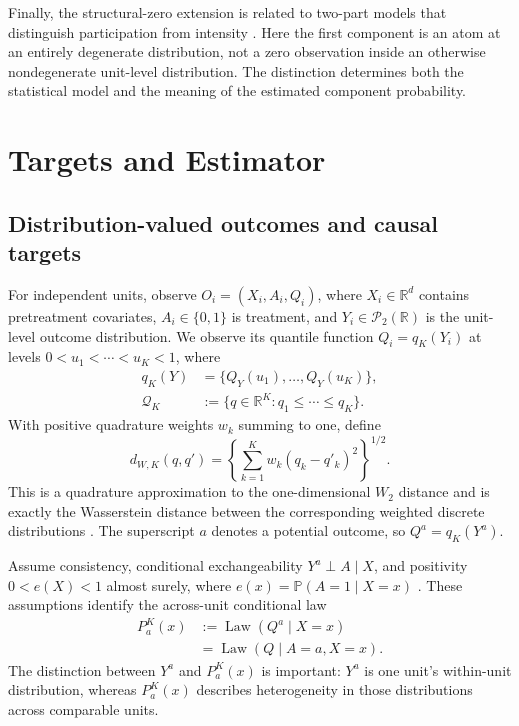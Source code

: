 \documentclass[twoside]{article}
\newcommand{\Prob}{\mathbb{P}}
\newcommand{\QK}{\mathcal{Q}_K}
\newcommand{\Law}{\operatorname{Law}}
\begin{document}
Finally, the structural-zero extension is related to two-part models that distinguish participation from intensity \citep{duan1983medical,mullahy1986modified}. Here the first component is an atom at an entirely degenerate distribution, not a zero observation inside an otherwise nondegenerate unit-level distribution. The distinction determines both the statistical model and the meaning of the estimated component probability.

\section{Targets and Estimator}\label{sec:model}

\subsection{Distribution-valued outcomes and causal targets}\label{sec:targets}

For independent units, observe $O_i=(X_i,A_i,Q_i)$, where $X_i\in\mathbb R^d$ contains pretreatment covariates, $A_i\in\{0,1\}$ is treatment, and $Y_i\in\mathcal P_2(\mathbb R)$ is the unit-level outcome distribution. We observe its quantile function $Q_i=q_K(Y_i)$ at levels $0<u_1<\cdots<u_K<1$, where
\begin{align*}
 q_K(Y)&=\{Q_Y(u_1),\ldots,Q_Y(u_K)\},\\
 \QK&:=\{q\in\mathbb R^K:q_1\leq\cdots\leq q_K\}.
\end{align*}
With positive quadrature weights $w_k$ summing to one, define
\[
 d_{W,K}(q,q')=\left\{\sum_{k=1}^K w_k(q_k-q'_k)^2\right\}^{1/2}.
\]
This is a quadrature approximation to the one-dimensional $W_2$ distance and is exactly the Wasserstein distance between the corresponding weighted discrete distributions \citep{peyre2019optimaltransport}. The superscript $a$ denotes a potential outcome, so $Q^a=q_K(Y^a)$.

Assume consistency, conditional exchangeability $Y^a\perp A\mid X$, and positivity $0<e(X)<1$ almost surely, where $e(x)=\Prob(A=1\mid X=x)$ \citep{rosenbaum1983propensity}. These assumptions identify the across-unit conditional law
\begin{align*}
 P_a^K(x)&:=\Law(Q^a\mid X=x)\\
 &=\Law(Q\mid A=a,X=x).
\end{align*}
The distinction between $Y^a$ and $P_a^K(x)$ is important: $Y^a$ is one unit's within-unit distribution, whereas $P_a^K(x)$ describes heterogeneity in those distributions across comparable units.
\end{document}
